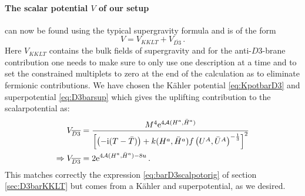 \documentclass[12pt]{report}
\newcommand{\be}{\begin{equation}}
\newcommand{\ee}{\end{equation}}
\newcommand{\bea}{\begin{equation}\begin{aligned}}
\newcommand{\eea}{\end{aligned}\end{equation}}
\def\rmi{{\rm i}}
\def\rme{{\rm e}}
\begin{document}
\paragraph{The scalar potential $V$ of our setup} can now be found using the typical supergravity formula and is of the form
\be 
V = V_{KKLT} + V_{\overline{D3}}\,.
\ee
Here $V_{KKLT}$ contains the bulk fields of supergravity and for the anti-$D3$-brane contribution one needs to make sure to only use one description at a time and to set the constrained multiplets to zero at the end of the calculation as to eliminate fermionic contributions. We have chosen the Kähler potential \eqref{eq:KpotbarD3} and superpotential \eqref{eq:D3barsup} which gives the uplifting contribution to the scalarpotential as:
\bea
V_{\overline{D3}} &= \frac{M^4 \rme^{4\mathcal{A}(H^a,\bar{H}^a)}}{\left[\left(-\rmi(T-\bar{T})\right) + k(H^a,\bar{H}^a)f\left(U^A,\bar{U}^A\right)^{-\frac{1}{3}}\right]^2}\\
\Rightarrow V_{\overline{D3}} &= 2 \rme^{4\mathcal{A}(H^a,\bar{H}^a)-8u}\,.
\eea
This matches correctly the expression \eqref{eq:barD3scalpotorig} of section \ref{sec:D3barKKLT} but comes from a Kähler and superpotential, as we desired.
\end{document}
